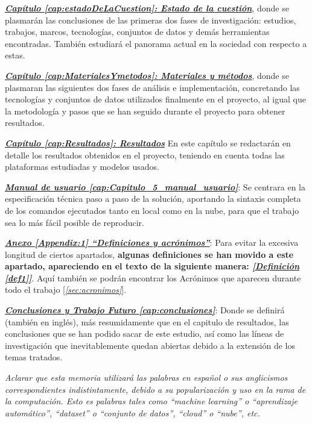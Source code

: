 \hyperref[cap:estadoDeLaCuestion]{\textbf{\textit{Capítulo \ref*{cap:estadoDeLaCuestion}: Estado de la cuestión}}}, donde se plasmarán las conclusiones de las primeras dos fases de investigación: estudios, trabajos, marcos, tecnologías, conjuntos de datos y demás herramientas encontradas. También estudiará el panorama actual en la sociedad con respecto a estas.

\hyperref[cap:MaterialesYmetodos]{\textbf{\textit{Capítulo \ref*{cap:MaterialesYmetodos}: Materiales y métodos}}}, donde se plasmaran las siguientes dos fases de análisis e implementación, concretando las tecnologías y conjuntos de datos utilizados finalmente en el proyecto, al igual que la metodología y pasos que se han seguido durante el proyecto para obtener resultados. 

\hyperref[cap:Resultados]{\textbf{\textit{Capítulo \ref*{cap:Resultados}: Resultados}}} En este capítulo se redactarán en detalle los resultados obtenidos en el proyecto, teniendo en cuenta todas las plataformas estudiadas y modelos usados.

\hyperref[cap:Capitulo_5_manual_usuario]{\textbf{\textit{Manual de usuario \ref*{cap:Capitulo_5_manual_usuario}}}}: Se centrara en la especificación técnica paso a paso de la solución, aportando la sintaxis completa de los comandos ejecutados tanto en local como en la nube, para que el trabajo sea lo más fácil posible de reproducir.

\hyperref[Appendix:1]{\textbf{\textit{Anexo \ref*{Appendix:1} ``Definiciones y acrónimos''}}}: Para evitar la excesiva longitud de ciertos apartados, \textbf{algunas definiciones se han movido a este apartado, apareciendo en el texto de la siguiente manera:  \hyperref[def1]{\textit{[Definición \ref*{def1}]}}}. Aquí también se podrán encontrar los Acrónimos que aparecen durante todo el trabajo [\textit{\ref{sec:acronimos}}]. 

\hyperref[cap:conclusiones]{\textbf{\textit{Conclusiones y Trabajo Futuro \ref*{cap:conclusiones}}}}: Donde se definirá  (también en inglés), más resumidamente que en el capitulo de resultados, las conclusiones que se han podido sacar de este estudio, así como las líneas de investigación que inevitablemente quedan abiertas debido a la extensión de los temas tratados.

\emph{Aclarar que esta memoria utilizará las palabras en español o sus anglicismos correspondientes indistintamente, debido a su popularización y uso en la rama de la computación. Esto es palabras tales como ``machine learning'' o ``aprendizaje automático'', ``dataset'' o ``conjunto de datos'', ``cloud'' o ``nube'', etc.}